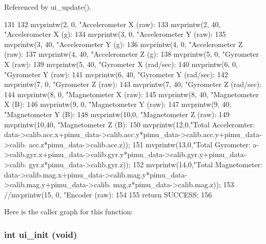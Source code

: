 Referenced by ui\_\-update().




\begin{DoxyCode}
131 {
132         mvprintw(2, 0, "Accelerometer X (raw): %
133         mvprintw(2, 40, "Accelerometer X (g): %
134         mvprintw(3, 0, "Accelerometer Y (raw): %
135         mvprintw(3, 40, "Accelerometer Y (g): %
136         mvprintw(4, 0, "Accelerometer Z (raw): %
137         mvprintw(4, 40, "Accelerometer Z (g): %
138         mvprintw(5, 0, "Gyrometer X (raw):     %
139         mvprintw(5, 40, "Gyrometer X (rad/sec):   %
140         mvprintw(6, 0, "Gyrometer Y (raw):     %
141         mvprintw(6, 40, "Gyrometer Y (rad/sec):   %
142         mvprintw(7, 0, "Gyrometer Z (raw):     %
143         mvprintw(7, 40, "Gyrometer Z (rad/sec):   %
144         mvprintw(8, 0, "Magnetometer X (raw):  %
145         mvprintw(8, 40, "Magnetometer X (B):     %
146         mvprintw(9, 0, "Magnetometer Y (raw):  %
147         mvprintw(9, 40, "Magnetometer Y (B):     %
148         mvprintw(10,0, "Magnetometer Z (raw):  %
149         mvprintw(10,40, "Magnetometer Z (B):     %
150         mvprintw(12,0,"Total Acceleromter: %
      data->calib.acc.x+pimu_data->calib.acc.y*pimu_data->calib.acc.y+pimu_data->calib.
      acc.z*pimu_data->calib.acc.z));
151         mvprintw(13,0,"Total Gyrometer: %
      a->calib.gyr.x+pimu_data->calib.gyr.y*pimu_data->calib.gyr.y+pimu_data->calib.
      gyr.z*pimu_data->calib.gyr.z));
152         mvprintw(14,0,"Total Magnetometer: %
      data->calib.mag.x+pimu_data->calib.mag.y*pimu_data->calib.mag.y+pimu_data->calib.
      mag.z*pimu_data->calib.mag.z));
153         //mvprintw(15, 0, "Encoder (raw): %
154 
155         return SUCCESS;
156 }
\end{DoxyCode}




Here is the caller graph for this function:

\hypertarget{group__ui_gab7bfb453918dcc296ff0cea3c79453d0}{
\subsubsection[{ui\_\-init}]{\setlength{\rightskip}{0pt plus 5cm}int ui\_\-init (void)}}
\label{group__ui_gab7bfb453918dcc296ff0cea3c79453d0}


